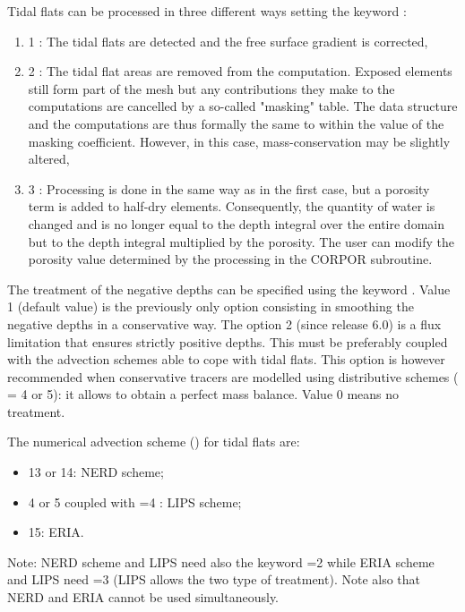  Tidal flats can be processed in three different ways setting the keyword :

\begin{enumerate}
\item  [\nonumber] 1 : The tidal flats are detected and the free surface gradient is corrected,

\item  [\nonumber] 2 : The tidal flat areas are removed from the computation. Exposed elements still form part of the mesh but any contributions they make to the computations are cancelled by a so-called "masking" table. The data structure and the computations are thus formally the same to within the value of the masking coefficient. However, in this case, mass-conservation may be slightly altered,

\item [\nonumber] 3 : Processing is done in the same way as in the first case, but a porosity term is added to half-dry elements. Consequently, the quantity of water is changed and is no longer equal to the depth integral over the entire domain but to the depth integral multiplied by the porosity. The user can modify the porosity value determined by the processing in the CORPOR subroutine.
\end{enumerate}


 The treatment of the negative depths can be specified using the keyword . Value 1 (default value) is the previously only option consisting in smoothing the negative depths in a conservative way. The option 2 (since release 6.0) is a flux limitation that ensures strictly positive depths. This must be preferably coupled with the advection schemes able to cope with tidal flats. This option is however recommended when conservative tracers are modelled using distributive schemes ( = 4 or 5): it allows to obtain a perfect mass balance. Value 0 means no treatment. 

 The numerical advection scheme () for tidal flats are:
\begin{itemize}
\item 13 or 14: NERD scheme;
\item 4 or 5 coupled with =4 : LIPS scheme;
\item 15: ERIA.
\end{itemize}

\begin{WarningBlock}{Note:}
NERD scheme and LIPS need also the keyword =2 while ERIA scheme and LIPS need =3 (LIPS allows the two type of treatment). Note also that NERD and ERIA cannot be used simultaneously.
\end{WarningBlock}

